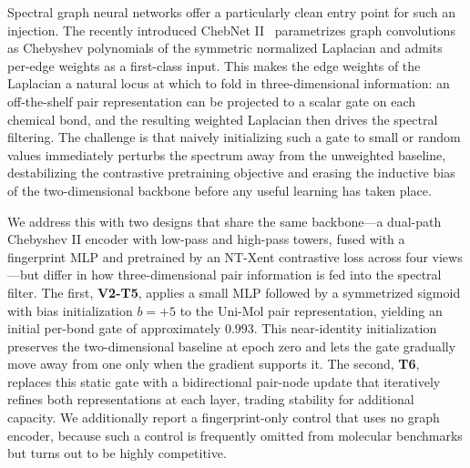 \documentclass[conference]{IEEEtran}
\begin{document}
Spectral graph neural networks offer a particularly clean entry point for such an injection. The recently introduced ChebNet II~\cite{he2022chebnetii} parametrizes graph convolutions as Chebyshev polynomials of the symmetric normalized Laplacian and admits per-edge weights as a first-class input. This makes the edge weights of the Laplacian a natural locus at which to fold in three-dimensional information: an off-the-shelf pair representation can be projected to a scalar gate on each chemical bond, and the resulting weighted Laplacian then drives the spectral filtering. The challenge is that naively initializing such a gate to small or random values immediately perturbs the spectrum away from the unweighted baseline, destabilizing the contrastive pretraining objective and erasing the inductive bias of the two-dimensional backbone before any useful learning has taken place.

We address this with two designs that share the same backbone---a dual-path Chebyshev II encoder with low-pass and high-pass towers, fused with a fingerprint MLP and pretrained by an NT-Xent contrastive loss across four views---but differ in how three-dimensional pair information is fed into the spectral filter. The first, \textbf{V2-T5}, applies a small MLP followed by a symmetrized sigmoid with bias initialization $b{=}{+}5$ to the Uni-Mol pair representation, yielding an initial per-bond gate of approximately $0.993$. This near-identity initialization preserves the two-dimensional baseline at epoch zero and lets the gate gradually move away from one only when the gradient supports it. The second, \textbf{T6}, replaces this static gate with a bidirectional pair-node update that iteratively refines both representations at each layer, trading stability for additional capacity. We additionally report a fingerprint-only control that uses no graph encoder, because such a control is frequently omitted from molecular benchmarks but turns out to be highly competitive.
\end{document}
